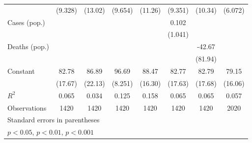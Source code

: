 \documentclass{article}
\begin{document}
{\begin{longtable}{l*{7}{c}}
                &  (9.328)         &  (13.02)         &  (9.654)         &  (11.26)         &  (9.351)         &  (10.34)         &  (6.072)         \\
Cases (pop.)    &                  &                  &                  &                  &    0.102         &                  &                  \\
                &                  &                  &                  &                  &  (1.041)         &                  &                  \\
Deaths (pop.)   &                  &                  &                  &                  &                  &   -42.67         &                  \\
                &                  &                  &                  &                  &                  &  (81.94)         &                  \\
Constant        &    82.78\sym{**} &    86.89\sym{**} &    96.69\sym{***}&    88.47\sym{***}&    82.77\sym{**} &    82.79\sym{**} &    79.15\sym{***}\\
                &  (17.67)         &  (22.13)         &  (8.251)         &  (16.30)         &  (17.63)         &  (17.68)         &  (16.06)         \\
\hline
\(R^{2}\)       &    0.065         &    0.034         &    0.125         &    0.158         &    0.065         &    0.065         &    0.057         \\
Observations    &     1420         &     1420         &     1420         &     1420         &     1420         &     1420         &     2020         \\
\hline\hline
\multicolumn{8}{l}{\footnotesize Standard errors in parentheses}\\
\multicolumn{8}{l}{\footnotesize \sym{*} \(p<0.05\), \sym{**} \(p<0.01\), \sym{***} \(p<0.001\)}\\
\end{longtable}
}
\end{document}

